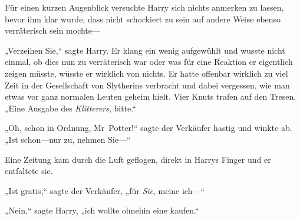 
Für einen kurzen Augenblick versuchte Harry sich nichts anmerken zu lassen, bevor ihm klar wurde, dass nicht schockiert zu sein auf andere Weise ebenso verräterisch sein mochte—

„Verzeihen Sie,“ sagte Harry. Er klang ein wenig aufgewühlt und wusste nicht einmal, ob dies nun zu verräterisch war oder was für eine Reaktion er eigentlich zeigen müsste, wüsste er wirklich von nichts. Er hatte offenbar wirklich zu viel Zeit in der Gesellschaft von Slytherins verbracht und dabei vergessen, wie man etwas vor ganz normalen Leuten geheim hielt. Vier Knuts trafen auf den Tresen. „Eine Ausgabe des \emph{Klitterers}, bitte.“

„Oh, schon in Ordnung, Mr~Potter!“ sagte der Verkäufer hastig und winkte ab. „Ist schon—nur zu, nehmen Sie—“

Eine Zeitung kam durch die Luft geflogen, direkt in Harrys Finger und er entfaltete sie.


„Ist gratis,“ sagte der Verkäufer, „für \emph{Sie}, meine ich—“

„Nein,“ sagte Harry, „ich wollte ohnehin eine kaufen.“


